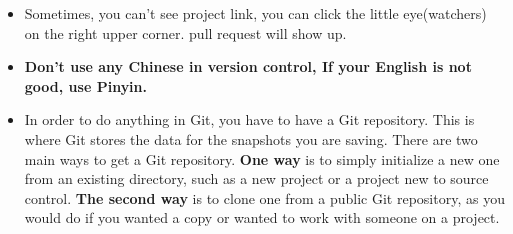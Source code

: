\documentclass[a4paper,12pt,twoside]{book}
\begin{document}
\begin{itemize}
    \item Sometimes, you can't see project link, you can click the little eye(watchers) on the right upper corner. pull request will show up.

\item \textbf{Don't use any Chinese in version control, If your English is not good, use Pinyin.}
    
\item In order to do anything in Git, you have to have a Git repository. This is where Git stores the data for the snapshots you are saving. There are two main ways to get a Git repository. \textbf{One way} is to simply initialize a new one from an existing directory, such as a new project or a project new to source control. \textbf{The second way} is to clone one from a public Git repository, as you would do if you wanted a copy or wanted to work with someone on a project.
\end{itemize}
\end{document}
